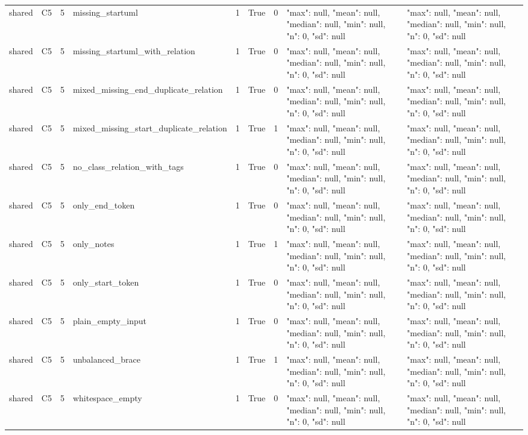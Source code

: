 \begin{tabular}{lllllllll}
shared & C5 & 5 & missing\_startuml & 1 & True & 0 & {"max": null, "mean": null, "median": null, "min": null, "n": 0, "sd": null} & {"max": null, "mean": null, "median": null, "min": null, "n": 0, "sd": null} \\
shared & C5 & 5 & missing\_startuml\_with\_relation & 1 & True & 0 & {"max": null, "mean": null, "median": null, "min": null, "n": 0, "sd": null} & {"max": null, "mean": null, "median": null, "min": null, "n": 0, "sd": null} \\
shared & C5 & 5 & mixed\_missing\_end\_duplicate\_relation & 1 & True & 0 & {"max": null, "mean": null, "median": null, "min": null, "n": 0, "sd": null} & {"max": null, "mean": null, "median": null, "min": null, "n": 0, "sd": null} \\
shared & C5 & 5 & mixed\_missing\_start\_duplicate\_relation & 1 & True & 1 & {"max": null, "mean": null, "median": null, "min": null, "n": 0, "sd": null} & {"max": null, "mean": null, "median": null, "min": null, "n": 0, "sd": null} \\
shared & C5 & 5 & no\_class\_relation\_with\_tags & 1 & True & 0 & {"max": null, "mean": null, "median": null, "min": null, "n": 0, "sd": null} & {"max": null, "mean": null, "median": null, "min": null, "n": 0, "sd": null} \\
shared & C5 & 5 & only\_end\_token & 1 & True & 0 & {"max": null, "mean": null, "median": null, "min": null, "n": 0, "sd": null} & {"max": null, "mean": null, "median": null, "min": null, "n": 0, "sd": null} \\
shared & C5 & 5 & only\_notes & 1 & True & 1 & {"max": null, "mean": null, "median": null, "min": null, "n": 0, "sd": null} & {"max": null, "mean": null, "median": null, "min": null, "n": 0, "sd": null} \\
shared & C5 & 5 & only\_start\_token & 1 & True & 0 & {"max": null, "mean": null, "median": null, "min": null, "n": 0, "sd": null} & {"max": null, "mean": null, "median": null, "min": null, "n": 0, "sd": null} \\
shared & C5 & 5 & plain\_empty\_input & 1 & True & 0 & {"max": null, "mean": null, "median": null, "min": null, "n": 0, "sd": null} & {"max": null, "mean": null, "median": null, "min": null, "n": 0, "sd": null} \\
shared & C5 & 5 & unbalanced\_brace & 1 & True & 1 & {"max": null, "mean": null, "median": null, "min": null, "n": 0, "sd": null} & {"max": null, "mean": null, "median": null, "min": null, "n": 0, "sd": null} \\
shared & C5 & 5 & whitespace\_empty & 1 & True & 0 & {"max": null, "mean": null, "median": null, "min": null, "n": 0, "sd": null} & {"max": null, "mean": null, "median": null, "min": null, "n": 0, "sd": null} \\

\end{tabular}
